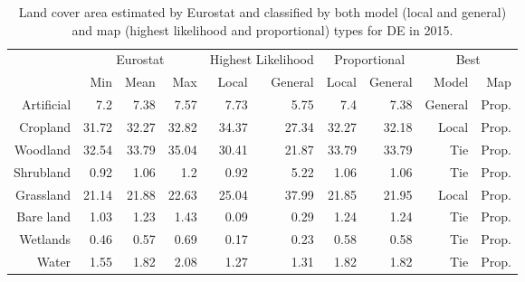 \begin{table}[H]
\centering
\caption{Land cover area estimated by Eurostat and classified by both model (local and general) and map (highest likelihood and proportional) types for DE in 2015.}

\begin{tabular}{r|rrr|rr|rr|rr}
\toprule
{} & \multicolumn{3}{|c}{Eurostat} & \multicolumn{2}{|c}{Highest Likelihood} & \multicolumn{2}{|c}{Proportional} & \multicolumn{2}{|c}{Best} \\
{} &      Min &   Mean &    Max &              Local & General &        Local & General &    Model &    Map \\
\midrule
Artificial &      7.2 &   7.38 &   7.57 &               7.73 &    5.75 &          7.4 &    7.38 &  General &  Prop. \\
Cropland   &    31.72 &  32.27 &  32.82 &              34.37 &   27.34 &        32.27 &   32.18 &    Local &  Prop. \\
Woodland   &    32.54 &  33.79 &  35.04 &              30.41 &   21.87 &        33.79 &   33.79 &      Tie &  Prop. \\
Shrubland  &     0.92 &   1.06 &    1.2 &               0.92 &    5.22 &         1.06 &    1.06 &      Tie &  Prop. \\
Grassland  &    21.14 &  21.88 &  22.63 &              25.04 &   37.99 &        21.85 &   21.95 &    Local &  Prop. \\
Bare land  &     1.03 &   1.23 &   1.43 &               0.09 &    0.29 &         1.24 &    1.24 &      Tie &  Prop. \\
Wetlands   &     0.46 &   0.57 &   0.69 &               0.17 &    0.23 &         0.58 &    0.58 &      Tie &  Prop. \\
Water      &     1.55 &   1.82 &   2.08 &               1.27 &    1.31 &         1.82 &    1.82 &      Tie &  Prop. \\
\bottomrule
\end{tabular}
\end{table}


